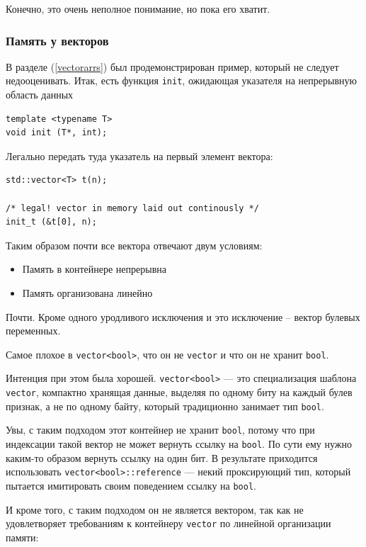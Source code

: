 \documentclass[a4paper,12pt,oneside]{article}
\begin{document}
Конечно, это очень неполное понимание, но пока его хватит.

\subsubsection{Память у векторов}\label{vecmemcontrol}

В разделе (\ref{vectorarrs}) был продемонстрирован пример, который не следует недооценивать. Итак, есть функция \lstinline!init!, ожидающая указателя на непрерывную область данных

\begin{lstlisting}
template <typename T>
void init (T*, int);
\end{lstlisting}

Легально передать туда указатель на первый элемент вектора:

\begin{lstlisting}
std::vector<T> t(n);

/* legal! vector in memory laid out continously */
init_t (&t[0], n);
\end{lstlisting}

Таким образом почти все вектора отвечают двум условиям:

\begin{itemize}
\item Память в контейнере непрерывна
\item Память организована линейно
\end{itemize}

Почти. Кроме одного уродливого исключения и это исключение -- вектор булевых переменных.

Самое плохое в \lstinline!vector<bool>!, что он не \lstinline!vector! и что он не хранит \lstinline!bool!.

Интенция при этом была хорошей. \lstinline!vector<bool>! — это специализация шаблона \lstinline!vector!, компактно хранящая данные, выделяя по одному биту на каждый булев признак, а не по одному байту, который традиционно занимает тип \lstinline!bool!.

Увы, с таким подходом этот контейнер не хранит \lstinline!bool!, потому что при индексации такой вектор не может вернуть ссылку на \lstinline!bool!. По сути ему нужно каким-то образом вернуть ссылку на один бит. В результате приходится использовать \lstinline!vector<bool>::reference! — некий проксирующий тип, который пытается имитировать своим поведением ссылку на \lstinline!bool!.

И кроме того, с таким подходом он не является вектором, так как не удовлетворяет требованиям к контейнеру \lstinline!vector! по линейной организации памяти:
\end{document}
